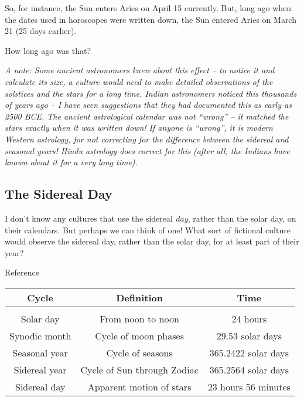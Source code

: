 \documentclass[11pt]{article}
\begin{document}
So, for instance, the Sun enters Aries on April 15 currently. But, long ago when the dates used in horoscopes were written down, the Sun entered Aries on March 21 (25 days earlier). 

How long ago was that?

\vspace{2in}
\underline{\hspace{6in}}


{\it A note: Some ancient astronomers knew about this effect -- to notice it and calculate its size, a culture would need to make detailed observations of the solstices and the stars for a long time. Indian astronomers noticed this thousands of years ago -- I have seen suggestions that they had documented this as early as 2500 BCE. The ancient astrological calendar was not ``wrong'' -- it matched the stars exactly when it was written down! If anyone is ``wrong'', it is {\it modern} Western astrology, for not correcting for the difference between the sidereal and seasonal years! Hindu astrology {\it} does correct for this (after all, the Indians have known about it for a very long time).}

\subsection{The Sidereal Day}

I don't know any cultures that use the sidereal {\it day}, rather than the solar day, on their calendars. But perhaps we can think of one! What sort of fictional culture would observe the sidereal day, rather than the solar day, for at least part of their year?


\newpage

\Large

\begin{center}
	
	Reference
	\vspace{3in}	

	\begin{tabular}{ccc}
		\bf Cycle & \bf Definition & \bf Time \\ \hline
		 & & \\ 
		Solar day & From noon to noon & 24 hours            \\
		Synodic month                 & Cycle of moon phases                  & 29.53 solar days    \\
		Seasonal year                 & Cycle of seasons                      & 365.2422 solar days \\
		Sidereal year                 & Cycle of Sun through Zodiac           & 365.2564 solar days \\
		Sidereal day                  & Apparent motion of stars              & 23 hours 56 minutes
	\end{tabular}

\end{center}
\end{document}
